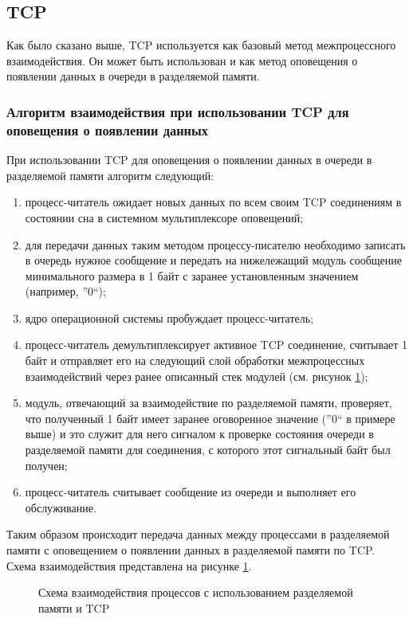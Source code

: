 \subsection{TCP}\label{chapter31:SignalTCP}

Как было сказано выше, TCP используется как базовый метод межпроцессного взаимодействия. Он может быть использован и как метод оповещения о появлении данных в очереди в разделяемой памяти.

\subsubsection{Алгоритм взаимодействия при использовании TCP для оповещения о появлении данных}

При использовании TCP для оповещения о появлении данных в очереди в разделяемой памяти алгоритм следующий:
\begin{enumerate}
\item процесс-читатель ожидает новых данных по всем своим TCP соединениям в состоянии сна в системном мультиплексоре оповещений;
\item для передачи данных таким методом процессу-писателю необходимо записать в очередь нужное сообщение и передать на нижележащий модуль сообщение минимального размера в 1 байт с заранее установленным значением (например, ''0``);
\item ядро операционной системы пробуждает процесс-читатель;
\item процесс-читатель демультиплексирует активное TCP соединение, считывает 1 байт и отправляет его на следующий слой обработки межпроцессных взаимодействий через ранее описанный стек модулей (см. рисунок \ref{chapter31:TCPShmemStack});
\item модуль, отвечающий за взаимодействие по разделяемой памяти, проверяет, что полученный 1 байт имеет заранее оговоренное значение (''0`` в примере выше) и это служит для него сигналом к проверке состояния очереди в разделяемой памяти для соединения, с которого этот сигнальный байт был получен;
\item процесс-читатель считывает сообщение из очереди и выполняет его обслуживание.
\end{enumerate}

Таким образом происходит передача данных между процессами в разделяемой памяти с оповещением о появлении данных в разделяемой памяти по TCP. Схема взаимодействия представлена на рисунке \ref{chapter31:TCPShmemStack}.

\begin{figure}[!h]
\caption{Схема взаимодействия процессов с использованием разделяемой памяти и TCP}
\label{chapter31:TCPShmemStack}
\end{figure}

